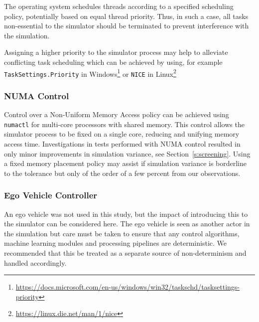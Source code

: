 \DIFdelend The operating system schedules threads according to a specified scheduling policy, potentially based on equal thread priority. Thus, in such a case, all tasks non-essential to the simulator should be terminated to prevent interference with the simulation. \DIFdelbegin %

\DIFdelend Assigning a higher priority to the simulator process may help to alleviate conflicting task scheduling which can be achieved by using, for example \texttt{TaskSettings.Priority} in Windows\DIFdelbegin {}\DIFdelend \DIFaddbegin \footnote{\url{https://docs.microsoft.com/en-us/windows/win32/taskschd/tasksettings-priority}}
\DIFaddend or \texttt{NICE} in Linux\DIFdelbegin {}\DIFdelend \DIFaddbegin \footnote{\url{https://linux.die.net/man/1/nice}}\DIFaddend 

\subsubsection{NUMA Control}
Control over a Non-Uniform Memory Access policy can be achieved using \texttt{numactl} for multi-core processors with shared memory. This control allows the simulator process to be fixed on a single core, reducing and unifying memory access time. Investigations in tests performed with NUMA control resulted in only minor improvements in simulation variance, see Section~\ref{s:screening}. Using a fixed memory placement policy may assist if simulation variance is borderline to the tolerance but only of the order of a few percent from our observations.

\subsubsection{Ego Vehicle Controller} 
An ego vehicle was not used in this study, but the impact of introducing this to the simulator can be considered here. The ego vehicle is seen as another actor in the simulation but care must be taken to ensure that any control algorithms, machine learning modules and processing pipelines are deterministic. We recommended that this be treated as a separate source of non-determinism and handled accordingly. 


